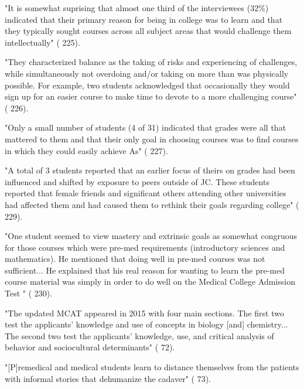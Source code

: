 

"It is somewhat suprising that almost one third of the interviewees (32\%) indicated that their primary reason for being in college was to learn and that they typically sought courses across all subject areas that would challenge them intellectually" (\cite{Horowitz-2010} 225).

"They characterized balance as the taking of risks and experiencing of challenges, while simultaneously not overdoing and/or taking on more than was physically possible. For example, two students acknowledged that occasionally they would sign up for an easier course to make time to devote to a more challenging course" (\cite{Horowitz-2010} 226).


"Only a small number of students (4 of 31) indicated that grades were all that mattered to them and that their only goal in choosing courses was to find courses in which they could easily achieve As" (\cite{Horowitz-2010} 227).

"A total of 3 students reported that an earlier focus of theirs on grades had been influenced and shifted by exposure to peers outside of JC. These students reported that female friends and significant others attending other universities had affected them and had caused them to rethink their goals regarding college" (\cite{Horowitz-2010} 229).

"One student seemed to view mastery and extrinsic goals as somewhat congruous for those courses which were pre-med requirements (introductory sciences and mathematics). He mentioned that doing well in pre-med courses was not sufficient... He explained that his real reason for wanting to learn the pre-med course material was simply in order to do well on the Medical College Admission Test " (\cite{Horowitz-2010} 230).




"The updated MCAT appeared in 2015 with four main sections. The first two test the applicants' knowledge and use of concepts in biology [and] chemistry... The second two test the applicants' knowledge, use, and critical analysis of behavior and sociocultural determinants" (\cite{Olsen-2016} 72).

"[P]remedical and medical students learn to distance themselves from the patients with informal stories that dehumanize the cadaver" (\cite{Olsen-2016} 73).

